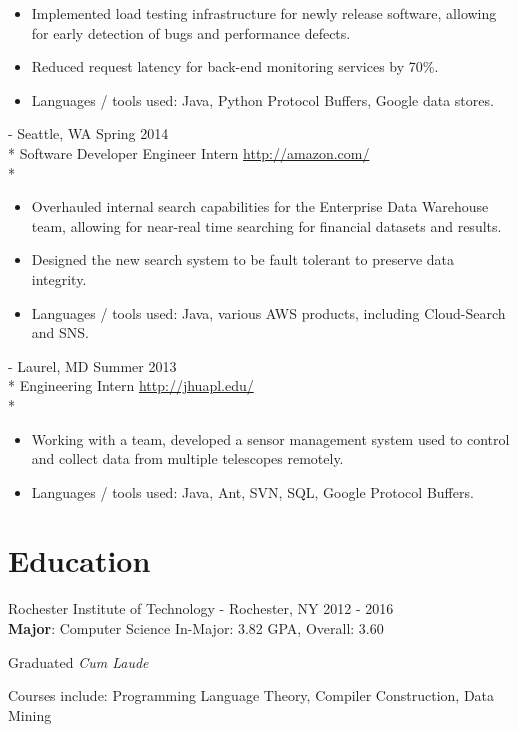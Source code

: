 \documentclass[a4paper,margin,line]{resume}
\newcommand{\rurl}[1]{\hfill {\footnotesize \url{#1}}}
\newcommand{\rdate}[1]{\hfill {\small #1}}
\renewcommand{\employer}[5]{ \item[#1] - #2 \rdate{#3} \\* #4 \rurl{#5} \\*}
\begin{document}
\begin{resume}
\begin{asparadesc}
\begin{itemize}
    \item Implemented load testing infrastructure for newly release software, allowing for early
      detection of bugs and performance defects.
    \item Reduced request latency for back-end monitoring services by 70\%.
    \item Languages / tools used: Java, Python Protocol Buffers, Google data stores.
    \end{itemize}
    \employer{Amazon}{Seattle, WA}{Spring 2014}{Software Developer Engineer
      Intern}{http://amazon.com/}
    \vspace{-5mm}
    \begin{itemize}
    \item Overhauled internal search capabilities for the Enterprise Data Warehouse team, allowing
      for near-real time searching for financial datasets and results.
    \item Designed the new search system to be fault tolerant to preserve data integrity.
    \item Languages / tools used: Java, various AWS products, including Cloud-Search and SNS.
    \end{itemize}
    \employer{John Hopkins University Applied Physics Lab}{Laurel, MD}{Summer 2013}{Engineering
      Intern}{http://jhuapl.edu/}
    \vspace{-5mm}
    \begin{itemize}
    \item Working with a team, developed a sensor management system used to control and collect data
      from multiple telescopes remotely.
    \item Languages / tools used: Java, Ant, SVN, SQL, Google Protocol Buffers.
    \end{itemize}
  \end{asparadesc}
  \section{\mysidestyle Education}
  \begin{compactdesc}
  \item[Rochester Institute of Technology] - Rochester, NY \hfill {2012 - 2016} \\
    \textbf{Major}: Computer Science \hfill {In-Major: 3.82 GPA, Overall: 3.60} \\
    \vspace{-4mm}
    \begin{flushright} Graduated \textit{Cum Laude} \end{flushright}
    \vspace{1mm}
    \small Courses include: Programming Language Theory, Compiler Construction, Data Mining
  \end{compactdesc}
  \vspace{-2mm}

\end{resume}
\end{document}
